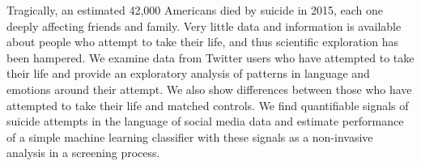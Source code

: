 Tragically, an estimated 42,000 Americans died by suicide in 2015, each one deeply affecting friends and family. Very little data and information is available about people who attempt to take their life, and thus scientific exploration has been hampered. We examine data from Twitter users who have attempted to take their life and provide an exploratory analysis of patterns in language and emotions around their attempt. We also show differences between those who have attempted to take their life and matched controls. We find quantifiable signals of suicide attempts in the language of social media data and estimate performance of a simple machine learning classifier with these signals as a non-invasive analysis in a screening process.
